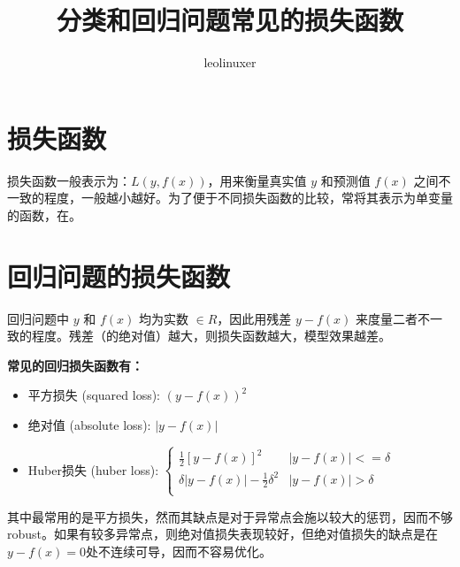 \documentclass[12pt]{article}
\title{分类和回归问题常见的损失函数}
\author{leolinuxer}
\begin{document}
\maketitle
\tableofcontents

\section{损失函数\cite{Compare_Loss_Func_Between_Regression_Classification}}
损失函数一般表示为：$L(y,f(x))$，用来衡量真实值 $y$ 和预测值 $f(x)$ 之间不一致的程度，一般越小越好。为了便于不同损失函数的比较，常将其表示为单变量的函数，在{\color{red}{回归问题中，这个变量为 $y-f(x)$， 在分类问题中，这个变量为 $yf(x)$}}。

\section{回归问题的损失函数}
回归问题中 $y$ 和 $f(x)$ 均为实数 $\in R$，因此用残差 $y-f(x)$ 来度量二者不一致的程度。残差（的绝对值）越大，则损失函数越大，模型效果越差。

\textbf{常见的回归损失函数有：}
\begin{itemize}[itemindent=2em]
    \item 平方损失 (squared loss): $(y-f(x))^2$
    
    \item 绝对值 (absolute loss): $|y-f(x)|$
    
    \item Huber损失 (huber loss): 
    $\begin{cases}
\frac{1}{2}[y-f(x)]^2 & |y-f(x)| <= \delta\\
\delta|y-f(x)|-\frac{1}{2}\delta^2 & |y-f(x)| > \delta\\
\end{cases}$
\end{itemize}

其中最常用的是平方损失，然而其缺点是对于异常点会施以较大的惩罚，因而不够robust。如果有较多异常点，则绝对值损失表现较好，但绝对值损失的缺点是在$y-f(x)=0$处不连续可导，因而不容易优化。
\end{document}
